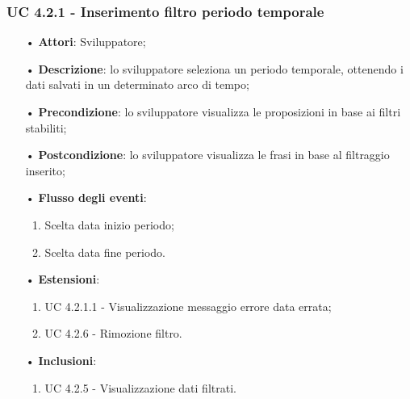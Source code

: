 \subsubsection{UC 4.2.1 - Inserimento filtro periodo temporale}
\begin{itemize}
\item[•]\textbf{Attori}: Sviluppatore;
\item[•]\textbf{Descrizione}: lo sviluppatore seleziona un periodo temporale, ottenendo i dati salvati in un determinato arco di tempo;
\item[•]\textbf{Precondizione}: lo sviluppatore visualizza le proposizioni in base ai filtri stabiliti;
\item[•]\textbf{Postcondizione}: lo sviluppatore visualizza le frasi in base al filtraggio inserito;
\item[•]\textbf{Flusso degli eventi}: 
\begin{enumerate}
\item Scelta data inizio periodo;
\item Scelta data fine periodo.
\end{enumerate}
\item[•]\textbf{Estensioni}: 
\begin{enumerate}
	\item UC 4.2.1.1 - Visualizzazione messaggio errore data errata;
	\item UC 4.2.6 - Rimozione filtro.
\end{enumerate}
\item[•]\textbf{Inclusioni}:
\begin{enumerate}
\item UC 4.2.5 - Visualizzazione dati filtrati.
\end{enumerate}
\end{itemize}

